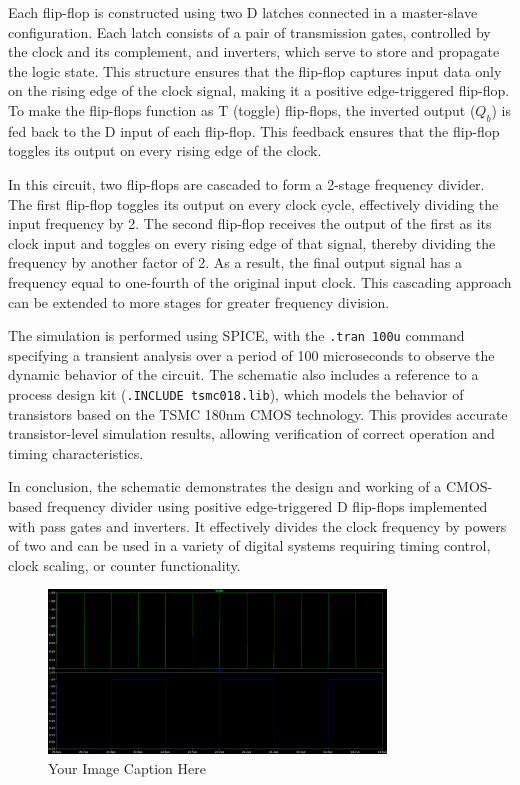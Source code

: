 Each flip-flop is constructed using two D latches connected in a master-slave configuration. Each latch consists of a pair of transmission gates, controlled by the clock and its complement, and inverters, which serve to store and propagate the logic state. This structure ensures that the flip-flop captures input data only on the rising edge of the clock signal, making it a positive edge-triggered flip-flop. To make the flip-flops function as T (toggle) flip-flops, the inverted output (\(Q_b\)) is fed back to the D input of each flip-flop. This feedback ensures that the flip-flop toggles its output on every rising edge of the clock.

In this circuit, two flip-flops are cascaded to form a 2-stage frequency divider. The first flip-flop toggles its output on every clock cycle, effectively dividing the input frequency by 2. The second flip-flop receives the output of the first as its clock input and toggles on every rising edge of that signal, thereby dividing the frequency by another factor of 2. As a result, the final output signal has a frequency equal to one-fourth of the original input clock. This cascading approach can be extended to more stages for greater frequency division.

The simulation is performed using SPICE, with the \texttt{.tran 100u} command specifying a transient analysis over a period of 100 microseconds to observe the dynamic behavior of the circuit. The schematic also includes a reference to a process design kit (\texttt{.INCLUDE tsmc018.lib}), which models the behavior of transistors based on the TSMC 180nm CMOS technology. This provides accurate transistor-level simulation results, allowing verification of correct operation and timing characteristics.

In conclusion, the schematic demonstrates the design and working of a CMOS-based frequency divider using positive edge-triggered D flip-flops implemented with pass gates and inverters. It effectively divides the clock frequency by powers of two and can be used in a variety of digital systems requiring timing control, clock scaling, or counter functionality.

\begin{figure}[H] %
    \centering
    \includegraphics[width=0.8\textwidth]{figs/waveform.png}
    \caption{Your Image Caption Here}
    \label{fig:Output Waveform}
\end{figure}
